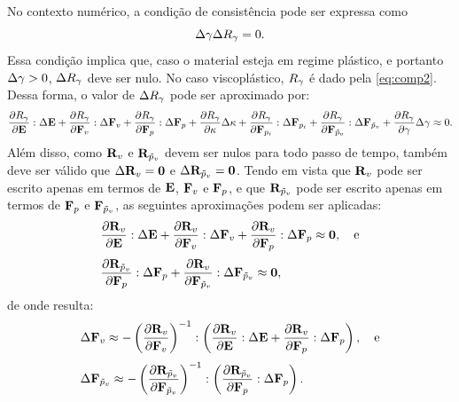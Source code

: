 \documentclass[Tese.tex]{subfiles}
\begin{document}
{No contexto numérico, a condição de consistência pode ser expressa como
\begin{equation}
\Delta{\gamma}\Delta R_{\gamma}=0.
\end{equation}
Essa condição implica que, caso o material esteja em regime plástico, e portanto $\Delta{\gamma}>0$, $\Delta R_{\gamma}$ deve ser nulo. No caso viscoplástico, $R_{\gamma}$ é dado pela \cref{eq:comp2}. Dessa forma, o valor de $\Delta R_{\gamma}$ pode ser aproximado por:
\begin{equation}
\dfrac{\partial R_{\gamma}}{\partial\mathbf{E}}:\Delta\mathbf{E} + \dfrac{\partial R_{\gamma}}{\partial\mathbf{F}_v}:\Delta\mathbf{F}_v + \dfrac{\partial R_{\gamma}}{\partial\mathbf{F}_p}:\Delta\mathbf{F}_p + \dfrac{\partial R_{\gamma}}{\partial\kappa}\Delta\kappa + \dfrac{\partial R_{\gamma}}{\partial\mathbf{F}_{p_i}}:\Delta\mathbf{F}_{p_i} + \dfrac{\partial R_{\gamma}}{\partial\mathbf{F}_{\tilde{p}_v}}:\Delta\mathbf{F}_{\tilde{p}_v} + \dfrac{\partial R_{\gamma}}{\partial\gamma}\Delta{\gamma} \approx 0.\label{eq:deltaRplast}
\end{equation}
Além disso, como $\mathbf{R}_v$ e $\mathbf{R}_{\tilde{p}_v}$ devem ser nulos para todo passo de tempo, também deve ser válido que $\Delta\mathbf{R}_v = \mathbf{0}$ e $\Delta\mathbf{R}_{\tilde{p}_v} = \mathbf{0}$. Tendo em vista que $\mathbf{R}_v$ pode ser escrito apenas em termos de $\mathbf{E}$, $\mathbf{F}_v$ e $\mathbf{F}_p$, e que $\mathbf{R}_{\tilde{p}_v}$ pode ser escrito apenas em termos de $\mathbf{F}_p$ e $\mathbf{F}_{\tilde{p}_v}$, as seguintes aproximações podem ser aplicadas:
\begin{align}
&\dfrac{\partial\mathbf{R}_v}{\partial\mathbf{E}}:\Delta\mathbf{E} + \dfrac{\partial\mathbf{R}_v}{\partial\mathbf{F}_v}:\Delta\mathbf{F}_v + \dfrac{\partial\mathbf{R}_v}{\partial\mathbf{F}_p}:\Delta\mathbf{F}_p \approx \mathbf{0},\text{\quad e}  \\[0.1cm]
&\dfrac{\partial\mathbf{R}_{\tilde{p}_v}}{\partial\mathbf{F}_p}:\Delta\mathbf{F}_p + \dfrac{\partial\mathbf{R}_v}{\partial\mathbf{F}_{\tilde{p}_v}}:\Delta\mathbf{F}_{\tilde{p}_v} \approx \mathbf{0},
\end{align}
de onde resulta:
\begin{align}
&\Delta\mathbf{F}_v \approx -\left(\dfrac{\partial\mathbf{R}_v}{\partial\mathbf{F}_v}\right)^{-1}:\left(\dfrac{\partial\mathbf{R}_v}{\partial\mathbf{E}}:\Delta\mathbf{E} + \dfrac{\partial\mathbf{R}_v}{\partial\mathbf{F}_p}:\Delta\mathbf{F}_p\right),\text{\quad e} \label{eq:deltaFv}\\[0.1cm]
&\Delta\mathbf{F}_{\tilde{p}_v} \approx -\left(\dfrac{\partial\mathbf{R}_{\tilde{p}_v}}{\partial\mathbf{F}_{\tilde{p}_v}}\right)^{-1}:\left(\dfrac{\partial\mathbf{R}_{\tilde{p}_v}}{\partial\mathbf{F}_p}:\Delta\mathbf{F}_p\right). \label{eq:deltaFpvi}
\end{align} 

}
\end{document}
